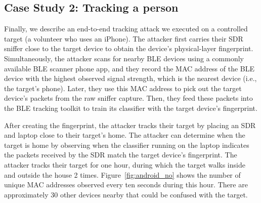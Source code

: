 \subsection{Case Study 2: Tracking a person}
\label{sec:results:case2}

%
%



Finally, we describe an end-to-end tracking attack we executed on a controlled
target (a volunteer who uses an iPhone).
%
The attacker first carries their SDR sniffer close to the target device to
obtain the device's physical-layer fingerprint. Simultaneously, the attacker
scans for nearby BLE devices using a commonly available BLE scanner phone app,
and they record the MAC address of the BLE device with the highest observed
signal strength, which is the nearest device (i.e., the target's phone). Later,
they use this MAC address to pick out the target device's packets from the raw
sniffer capture. Then, they feed these packets into the BLE tracking toolkit to
train its classifier with the target device's fingerprint.

After creating the fingerprint, the attacker tracks their target by placing an
SDR and laptop close to their target's home. The attacker can determine when the target is
home by observing when the classifier running on the laptop indicates the packets received by the SDR match the target device's fingerprint.
%
The attacker tracks their target for one hour, during which the target walks
inside and outside the house 2 times. Figure~\ref{fig:android_no} shows the
number of unique MAC addresses observed every ten seconds during this hour.
There are approximately 30 other devices nearby that could be confused with the target.


